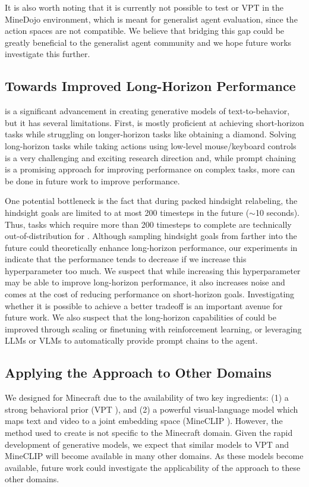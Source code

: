 It is also worth noting that it is currently not possible to test \agentname{} or VPT \citep{baker2022vpt} in the MineDojo \citep{fan2022minedojo} environment, which is meant for generalist agent evaluation, since the action spaces are not compatible. We believe that bridging this gap could be greatly beneficial to the generalist agent community and we hope future works investigate this further.

\subsection{Towards Improved Long-Horizon Performance}
\agentname{} is a significant advancement in creating generative models of text-to-behavior, but it has several limitations. First, \agentname{} is mostly proficient at achieving short-horizon tasks while struggling on longer-horizon tasks like obtaining a diamond. Solving long-horizon tasks while taking actions using low-level mouse/keyboard controls is a very challenging and exciting research direction and, while prompt chaining is a promising approach for improving performance on complex tasks, more can be done in future work to improve performance.

One potential bottleneck is the fact that during packed hindsight relabeling, the hindsight goals are limited to at most 200 timesteps in the future ($\sim$10 seconds). Thus, tasks which require more than 200 timesteps to complete are technically out-of-distribution for \agentname{}. Although sampling hindsight goals from farther into the future could theoretically enhance long-horizon performance, our experiments in  indicate that the performance tends to decrease if we increase this hyperparameter too much. We suspect that while increasing this hyperparameter may be able to improve long-horizon performance, it also increases noise and comes at the cost of reducing performance on short-horizon goals. Investigating whether it is possible to achieve a better tradeoff is an important avenue for future work. We also suspect that the long-horizon capabilities of \agentname{} could be improved through scaling or finetuning with reinforcement learning, or leveraging LLMs or VLMs to automatically provide prompt chains to the \agentname{} agent.


\subsection{Applying the \agentname{} Approach to Other Domains}

We designed \agentname{} for Minecraft due to the availability of two key ingredients: (1) a strong behavioral prior (VPT \citep{baker2022vpt}), and (2) a powerful visual-language model which maps text and video to a joint embedding space (MineCLIP \citep{fan2022minedojo}). However, the method used to create \agentname{} is not specific to the Minecraft domain. Given the rapid development of generative models, we expect that similar models to VPT and MineCLIP will become available in many other domains. As these models become available, future work could investigate the applicability of the \agentname{} approach to these other domains.